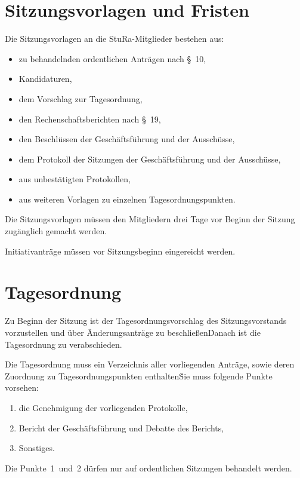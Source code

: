 \begin{multicols}{2}
\section{Sitzungsvorlagen und Fristen}

\Abs \Satz Die Sitzungsvorlagen an die StuRa-Mitglieder bestehen aus:
\begin{itemize}
\item zu behandelnden ordentlichen Anträgen nach §~10,
\item Kandidaturen,
\item dem Vorschlag zur Tagesordnung,
\item den Rechenschaftsberichten nach §~19,
\item den Beschlüssen der Geschäftsführung und der Ausschüsse,
\item dem Protokoll der Sitzungen der Geschäftsführung und der Ausschüsse,
\item aus unbestätigten Protokollen,
\item aus weiteren Vorlagen zu einzelnen Tagesordnungspunkten.
\end{itemize}

\Abs \Satz Die Sitzungsvorlagen müssen den Mitgliedern drei Tage vor Beginn der Sitzung zugänglich gemacht werden.

\Abs \Satz Initiativanträge müssen vor Sitzungsbeginn eingereicht werden.



\section{Tagesordnung}

\Abs \Satz Zu Beginn der Sitzung ist der Tagesordnungsvorschlag des Sitzungsvorstands vorzustellen und über Änderungsanträge zu beschließen\. Danach ist die Tagesordnung zu verabschieden.

\Abs \Satz Die Tagesordnung muss ein Verzeichnis aller vorliegenden Anträge, sowie deren Zuordnung zu Tagesordnungspunkten enthalten\. Sie muss folgende Punkte vorsehen:
\begin{enumerate}
\item die Genehmigung der vorliegenden Protokolle,
\item Bericht der Geschäftsführung und Debatte des Berichts,
\item Sonstiges.
\end{enumerate}

\Satz Die Punkte~1~und~2 dürfen nur auf ordentlichen Sitzungen behandelt werden.


\end{multicols}
